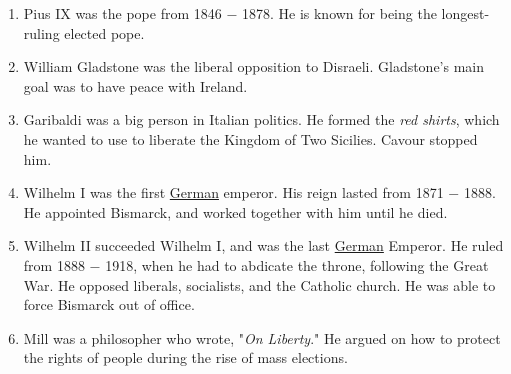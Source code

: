 \documentclass[12pt]{article}
\begin{document}
\begin{enumerate}
\item Pius IX was the pope from 1846 $-$ 1878. He is known for being the longest-ruling elected pope. 

\item William Gladstone was the liberal opposition to Disraeli. Gladstone's main goal was to have peace with Ireland.

\item Garibaldi was a big person in Italian politics. He formed the \textit{red shirts}, which he wanted to use to liberate the Kingdom of Two Sicilies. Cavour stopped him.

\item Wilhelm I was the first \underline{German} emperor. His reign lasted from 1871 $-$ 1888. He appointed Bismarck, and worked together with him until he died.

\item Wilhelm II succeeded Wilhelm I, and was the last \underline{German} Emperor. He ruled from 1888 $-$ 1918, when he had to abdicate the throne, following the Great War. He opposed liberals, socialists, and the Catholic church. He was able to force Bismarck out of office. 

\item Mill was a philosopher who wrote, "\textit{On Liberty}." He argued on how to protect the rights of people during the rise of mass elections. 


\vspace{24pt}


\end{enumerate}
\end{document}
